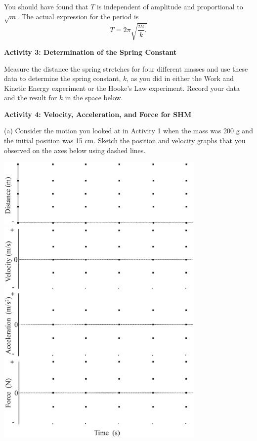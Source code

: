 You should have found that $T$ is independent of amplitude 
and proportional to \( \sqrt{m} \). The actual expression for the period is
\[T=2\pi \sqrt{\frac{m}{k}.}\]


%

\textbf{Activity 3: Determination of the Spring Constant }

Measure the distance the spring stretches for four different masses and use
these data to determine the spring constant, $k$, as you did in either the Work and Kinetic Energy experiment or the Hooke's Law experiment. Record your data and the result for $k$ in the space below.
\answerspace{40mm}

\pagebreak[2]
\textbf{Activity 4: Velocity, Acceleration, and Force for SHM} 

(a) Consider the motion you looked at in Activity 1 when the mass was 200 g
and the initial position was 15 cm. Sketch the position and velocity graphs
that you observed on the axes below using dashed lines.

\begin{center}
\includegraphics[width=4in]{periodic_motion/periodic_motion_fig2_new.eps}
\includegraphics[width=4in]{periodic_motion/periodic_motion_fig3_new.eps}
\end{center}

